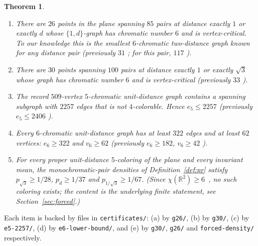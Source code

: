 \documentclass[11pt]{article}
\newtheorem{theorem}{Theorem}[section]
\theoremstyle{definition}
\theoremstyle{remark}
\newcommand{\R}{\mathbb{R}}
\newcommand{\dd}{d}                          %
\begin{document}
\begin{theorem}\label{thm:records}
\leavevmode
\begin{enumerate}[label=(\alph*)]
\item There are $26$ points in the plane spanning $85$ pairs at distance
exactly $1$ or exactly $\dd$ whose $\{1,\dd\}$-graph has chromatic number
$6$ and is vertex-critical.  To our knowledge this is the smallest
$6$-chromatic two-distance graph known for any distance pair (previously $31$
\cite{Parts20a}; for this pair, $117$ \cite{DeNeve25}).
\item There are $30$ points spanning $100$ pairs at distance exactly $1$
or exactly $\sqrt3$ whose graph has chromatic number $6$ and is
vertex-critical (previously $33$ \cite{DeNeve25}).
\item The record $509$-vertex $5$-chromatic unit-distance graph
\cite{Parts20b,deGreyParts22} contains a spanning subgraph with $2257$
edges that is not $4$-colorable.  Hence $e_5\le 2257$ (previously
$e_5\le 2406$ \cite{deGreyParts22}).
\item Every $6$-chromatic unit-distance graph has at least $322$ edges
and at least $62$ vertices: $e_6\ge322$ and $v_6\ge62$ (previously
$e_6\ge182$, $v_6\ge42$ \cite{deGreyParts22}).
\item For every proper unit-distance $5$-coloring of the plane and every
invariant mean, the monochromatic-pair densities of
Definition~\ref{def:pr} satisfy $p_{\sqrt3}\ge 1/28$, $p_{\dd}\ge 1/37$
and $p_{1/\sqrt3}\ge1/67$.  (Since $\chi(\R^2)\ge6$~\cite{OAI}, no such
coloring exists; the content is the underlying finite statement, see
Section~\ref{sec:forced}.)
\end{enumerate}
\end{theorem}

Each item is backed by files in \texttt{certificates/}: (a) by
\texttt{g26/}, (b) by \texttt{g30/}, (c) by \texttt{e5-2257/}, (d) by
\texttt{e6-lower-bound/}, and (e)
by \texttt{g30/}, \texttt{g26/} and \texttt{forced-density/}
respectively.
\end{document}
